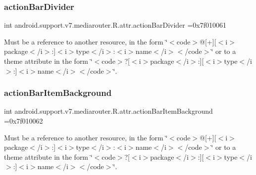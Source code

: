 \subsubsection{\texorpdfstring{action\+Bar\+Divider}{actionBarDivider}}
{\footnotesize\ttfamily int android.\+support.\+v7.\+mediarouter.\+R.\+attr.\+action\+Bar\+Divider =0x7f010061\hspace{0.3cm}{\ttfamily [static]}}

Must be a reference to another resource, in the form \char`\"{}$<$code$>$@\mbox{[}+\mbox{]}\mbox{[}$<$i$>$package$<$/i$>$\+:\mbox{]}$<$i$>$type$<$/i$>$\+:$<$i$>$name$<$/i$>$$<$/code$>$\char`\"{} or to a theme attribute in the form \char`\"{}$<$code$>$?\mbox{[}$<$i$>$package$<$/i$>$\+:\mbox{]}\mbox{[}$<$i$>$type$<$/i$>$\+:\mbox{]}$<$i$>$name$<$/i$>$$<$/code$>$\char`\"{}. \mbox{\label{classandroid_1_1support_1_1v7_1_1mediarouter_1_1R_1_1attr_acf2d518fb015adaa3c6f71ae62af3d15}} 
\subsubsection{\texorpdfstring{action\+Bar\+Item\+Background}{actionBarItemBackground}}
{\footnotesize\ttfamily int android.\+support.\+v7.\+mediarouter.\+R.\+attr.\+action\+Bar\+Item\+Background =0x7f010062\hspace{0.3cm}{\ttfamily [static]}}

Must be a reference to another resource, in the form \char`\"{}$<$code$>$@\mbox{[}+\mbox{]}\mbox{[}$<$i$>$package$<$/i$>$\+:\mbox{]}$<$i$>$type$<$/i$>$\+:$<$i$>$name$<$/i$>$$<$/code$>$\char`\"{} or to a theme attribute in the form \char`\"{}$<$code$>$?\mbox{[}$<$i$>$package$<$/i$>$\+:\mbox{]}\mbox{[}$<$i$>$type$<$/i$>$\+:\mbox{]}$<$i$>$name$<$/i$>$$<$/code$>$\char`\"{}. \mbox{\label{classandroid_1_1support_1_1v7_1_1mediarouter_1_1R_1_1attr_abfb9b5bce455843ed1c8d5b58009669c}} 
